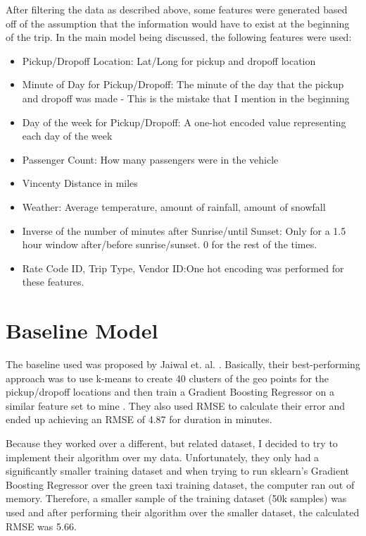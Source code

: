 \documentclass[conference]{IEEEtran}
\begin{document}
After filtering the data as described above, some features were generated based off of the assumption that the information would have to exist at the beginning of the trip.  
In the main model being discussed, the following features were used:
 \begin{itemize}
\item{Pickup/Dropoff Location: Lat/Long for pickup and dropoff location}
\item{Minute of Day for Pickup/Dropoff: The minute of the day that the pickup and dropoff was made - This is the mistake that I mention in the beginning}
\item{Day of the week for Pickup/Dropoff: A one-hot encoded value representing each day of the week}
\item{Passenger Count: How many passengers were in the vehicle}
\item{Vincenty Distance in miles}
\item{Weather: Average temperature, amount of rainfall, amount of snowfall}
\item{Inverse of the number of minutes after Sunrise/until Sunset: Only for a 1.5 hour window after/before sunrise/sunset. 0 for the rest of the times.}
\item{Rate Code ID, Trip Type, Vendor ID:One hot encoding was performed for these features.}
\end{itemize}

\section {Baseline Model} \label{baseline}
The baseline used was proposed by Jaiwal et. al. \cite{ucsd}.  Basically, their best-performing approach was to use k-means to create 40 clusters of the geo points for the pickup/dropoff locations and then train a Gradient Boosting Regressor on a similar feature set to mine \cite{ucsd}.  They also used RMSE to calculate their error and ended up achieving an RMSE of 4.87 for duration in minutes.

Because they worked over a different, but related dataset, I decided to try to implement their algorithm over my data.  Unfortunately, they only had a significantly smaller training dataset and when trying to run sklearn's Gradient Boosting Regressor over the green taxi training dataset, the computer ran out of memory.  Therefore, a smaller sample of the training dataset (50k samples) was used and after performing their algorithm over the smaller dataset, the calculated RMSE was 5.66.
\end{document}
